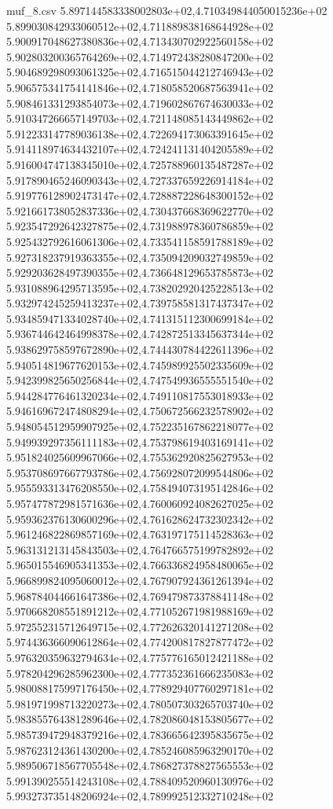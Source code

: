 \begin{filecontents*}{muf_8.csv}
5.897144583338002803e+02,4.710349844050015236e+02
5.899030842933060512e+02,4.711889838168644928e+02
5.900917048627380836e+02,4.713430702922560158e+02
5.902803200365764269e+02,4.714972438280847200e+02
5.904689298093061325e+02,4.716515044212746943e+02
5.906575341754141846e+02,4.718058520687563941e+02
5.908461331293854073e+02,4.719602867674630033e+02
5.910347266657149703e+02,4.721148085143449862e+02
5.912233147789036138e+02,4.722694173063391645e+02
5.914118974634432107e+02,4.724241131404205589e+02
5.916004747138345010e+02,4.725788960135487287e+02
5.917890465246090343e+02,4.727337659226914184e+02
5.919776128902473147e+02,4.728887228648300152e+02
5.921661738052837336e+02,4.730437668369622770e+02
5.923547292642327875e+02,4.731988978360786859e+02
5.925432792616061306e+02,4.733541158591788189e+02
5.927318237919363355e+02,4.735094209032749859e+02
5.929203628497390355e+02,4.736648129653785873e+02
5.931088964295713595e+02,4.738202920425228513e+02
5.932974245259413237e+02,4.739758581317437347e+02
5.934859471334028740e+02,4.741315112300699184e+02
5.936744642464998378e+02,4.742872513345637344e+02
5.938629758597672890e+02,4.744430784422611396e+02
5.940514819677620153e+02,4.745989925502335609e+02
5.942399825650256844e+02,4.747549936555551540e+02
5.944284776461320234e+02,4.749110817553018933e+02
5.946169672474808294e+02,4.750672566232578902e+02
5.948054512959907925e+02,4.752235167862218077e+02
5.949939297356111183e+02,4.753798619403169141e+02
5.951824025609967066e+02,4.755362920825627953e+02
5.953708697667793786e+02,4.756928072099544806e+02
5.955593313476208550e+02,4.758494073195142846e+02
5.957477872981571636e+02,4.760060924082627025e+02
5.959362376130600296e+02,4.761628624732302342e+02
5.961246822869857169e+02,4.763197175114528363e+02
5.963131213145843503e+02,4.764766575199782892e+02
5.965015546905341353e+02,4.766336824958480065e+02
5.966899824095060012e+02,4.767907924361261394e+02
5.968784044661647386e+02,4.769479873378841148e+02
5.970668208551891212e+02,4.771052671981988169e+02
5.972552315712649715e+02,4.772626320141271208e+02
5.974436366090612864e+02,4.774200817827877472e+02
5.976320359632794634e+02,4.775776165012421188e+02
5.978204296285962300e+02,4.777352361666235083e+02
5.980088175997176450e+02,4.778929407760297181e+02
5.981971998713220273e+02,4.780507303265703740e+02
5.983855764381289646e+02,4.782086048153805677e+02
5.985739472948379216e+02,4.783665642395835675e+02
5.987623124361430200e+02,4.785246085963290170e+02
5.989506718567705548e+02,4.786827378827565553e+02
5.991390255514243108e+02,4.788409520960130976e+02
5.993273735148206924e+02,4.789992512332710248e+02

\end{filecontents*}
